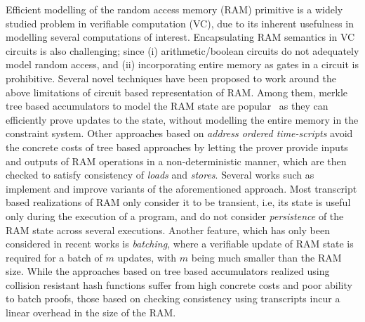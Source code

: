 Efficient modelling of the random access memory (RAM) primitive is a widely studied problem in
verifiable computation (VC), due to its inherent usefulness in modelling several computations of interest.
Encapsulating RAM semantics in VC circuits is also challenging; since (i) arithmetic/boolean circuits do not
adequately model random access, and (ii) incorporating entire memory as gates in a circuit is prohibitive.
Several novel techniques have been proposed to work around the above limitations of circuit based representation
of RAM. Among them, merkle tree based accumulators to model the RAM state are popular~\cite{EPRINT:BFRSBW13,compwithstate,C:BCTV14} as they can efficiently
prove updates to the state, without modelling the entire memory in the constraint system. Other
approaches based on {\em address ordered time-scripts} avoid the concrete costs of tree based approaches
by letting the prover provide inputs and outputs of RAM operations in a non-deterministic manner, which
are then checked to satisfy consistency of {\em loads} and {\em stores}.
Several works such as \cite{NDSS:WSRBW15,USENIX:BCTV14,C:BCGTV13,SP:ZGKPP18} implement and improve variants
of the aforementioned approach. Most transcript based realizations of RAM only consider it to be transient,
i.e, its state is useful only during the execution of a program, and do not consider {\em persistence} of the
RAM state across several executions. Another feature, which has only been considered in recent works
\cite{USENIX:OWWB20,CCS:CFHKKO22} is {\em batching}, where a verifiable update of RAM state is required
for a batch of $m$ updates, with $m$ being much smaller than the RAM size. While the approaches based on tree
based accumulators realized using collision resistant hash functions suffer from high concrete costs and poor
ability to batch proofs, those based on checking consistency using transcripts incur a linear overhead in the
size of the RAM.

